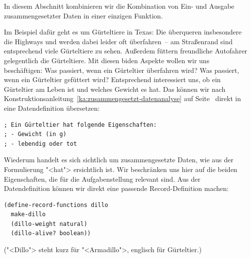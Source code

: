 In diesem Abschnitt kombinieren wir die Kombination von Ein- und
Ausgabe zusammengesetzter Daten in einer einzigen Funktion.

Im Beispiel dafür geht es um Gürteltiere in Texas:
Die überqueren insbesondere die Highways
und werden dabei leider oft überfahren~-- am Straßenrand
sind entsprechend viele Gürteltiere zu sehen.  Außerdem füttern
freundliche Autofahrer gelegentlich die Gürteltiere.  Mit diesen
biden Aspekte wollen wir uns beschäftigen: Was passiert, wenn ein
Gürteltier überfahren wird?  Was passiert, wenn ein Gürteltier
gefüttert wird?  Entsprechend interessiert uns, ob ein Gürteltier am
Leben ist und welches Gewicht es hat.  Das können wir nach
Konstruktionsanleitung~\ref{ka:zusammengesetzt-datenanalyse} auf
Seite~\pageref{ka:zusammengesetzt-datenanalyse} direkt in eine
Datendefinition übersetzen:
%
\begin{verbatim}
; Ein Gürteltier hat folgende Eigenschaften:
; - Gewicht (in g)
; - lebendig oder tot
\end{verbatim}
%
Wiederum handelt es sich sichtlich um zusammengesetzte Daten, wie
aus der Formulierung "<hat"> ersichtlich ist.  Wir beschränken uns
hier auf die beiden Eigenschaften, die für die Aufgabenstellung
relevant sind.
Aus der Datendefinition können wir direkt eine passende
Record-Definition machen:
% 
\begin{verbatim}
(define-record-functions dillo
  make-dillo
  (dillo-weight natural)
  (dillo-alive? boolean))
\end{verbatim}
%
("<Dillo"> steht kurz für "<Armadillo">, englisch für Gürteltier.)

